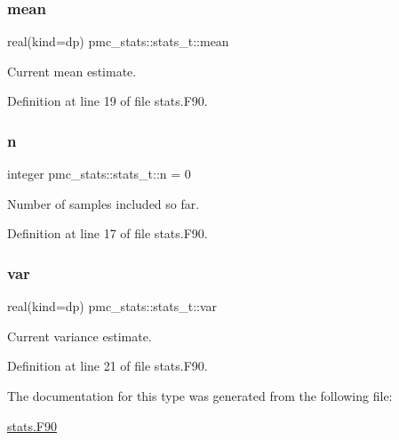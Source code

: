 \subsubsection{\texorpdfstring{mean}{mean}}
{\footnotesize\ttfamily real(kind=dp) pmc\+\_\+stats\+::stats\+\_\+t\+::mean}



Current mean estimate. 



Definition at line 19 of file stats.\+F90.

\mbox{\label{structpmc__stats_1_1stats__t_a31f07e959a4828e31629660f555d5823}} 
\subsubsection{\texorpdfstring{n}{n}}
{\footnotesize\ttfamily integer pmc\+\_\+stats\+::stats\+\_\+t\+::n = 0}



Number of samples included so far. 



Definition at line 17 of file stats.\+F90.

\mbox{\label{structpmc__stats_1_1stats__t_ad9ab56f6b99a2b0de1062dc6e9ea6c7a}} 
\subsubsection{\texorpdfstring{var}{var}}
{\footnotesize\ttfamily real(kind=dp) pmc\+\_\+stats\+::stats\+\_\+t\+::var}



Current variance estimate. 



Definition at line 21 of file stats.\+F90.



The documentation for this type was generated from the following file\+:\begin{DoxyCompactItemize}
\item 
\mbox{\hyperlink{stats_8_f90}{stats.\+F90}}\end{DoxyCompactItemize}
